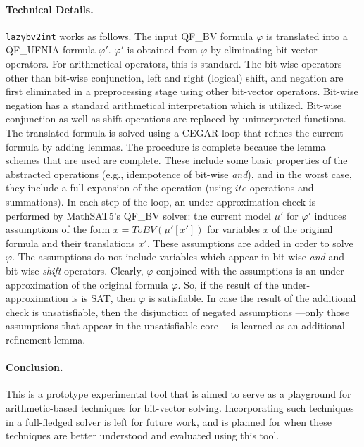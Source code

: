 \documentclass{easychair}
\newcommand{\lazybvtoint}{\texttt{lazybv2int}\xspace}
\newcommand{\qfbv}{QF\_BV\xspace}
\newcommand{\qfufnia}{QF\_UFNIA\xspace}
\newcommand{\msat}{MathSAT5\xspace}
\begin{document}
\paragraph{Technical Details.}
\lazybvtoint works as follows. The input \qfbv formula $\varphi$ is translated
into a \qfufnia formula $\varphi'$. $\varphi'$ is obtained from $\varphi$ by
eliminating bit-vector operators. For arithmetical operators, this is standard.
The bit-wise operators other than bit-wise conjunction, left and right (logical)
shift, and negation are first eliminated in a preprocessing stage using other
bit-vector operators. Bit-wise negation has a standard arithmetical
interpretation which is utilized. Bit-wise conjunction as well as shift
operations are replaced by uninterpreted functions.
%
The translated formula is solved using a CEGAR-loop that refines the current
formula by adding lemmas. The procedure is complete because the lemma schemes
that are used are complete.
%
These include some basic properties of the abstracted operations (e.g.,
idempotence of bit-wise \emph{and}), and in the worst case, they include a full
expansion of the operation (using $ite$ operations and summations).
%
In each step of the loop, an under-approximation check is performed by \msat's
\qfbv solver: the current model $\mu'$ for $\varphi'$ induces assumptions
of the form $x=ToBV(\mu'[x'])$ for variables $x$ of the original formula
and their translations $x'$. 
These assumptions are added in order to solve $\varphi$.
The assumptions do not
include variables which appear in bit-wise \emph{and} and bit-wise \emph{shift} 
operators.
Clearly, $\varphi$ conjoined with the assumptions is an under-approximation of
the original formula $\varphi$. So, if the result of the under-approximation is
is SAT, then $\varphi$ is satisfiable. In case the result of the additional
check is unsatisfiable, then the disjunction of negated assumptions ---only those
assumptions that appear in the unsatisfiable core--- is learned as an additional
refinement lemma.



\paragraph{Conclusion.}
This is a prototype experimental tool that is aimed to serve as a
playground for arithmetic-based techniques for bit-vector solving. Incorporating
such techniques in a full-fledged solver is left for future work, and is planned
for when these techniques are better understood and evaluated using this tool.
\end{document}
